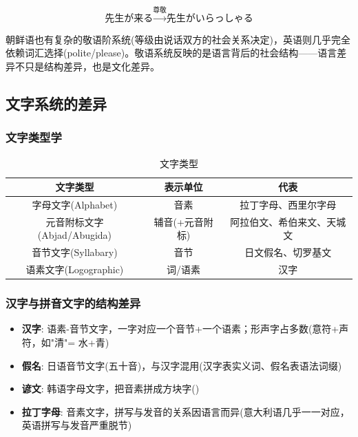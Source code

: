 \begin{equation}
    \text{先生が来る} \xrightarrow{\text{尊敬}} \text{先生がいらっしゃる}
\end{equation}

朝鲜语也有复杂的敬语阶系统(等级由说话双方的社会关系决定)，英语则几乎完全依赖词汇选择(polite/please)。敬语系统反映的是语言背后的社会结构——语言差异不只是结构差异，也是文化差异。

\subsection{文字系统的差异}

\subsubsection{文字类型学}

\begin{table}[H]
\centering
\caption{文字类型}
\begin{tabulary}{\textwidth}{@{}CCC@{}}
\toprule
\textbf{文字类型} & \textbf{表示单位} & \textbf{代表} \\
\midrule
字母文字(Alphabet) & 音素 & 拉丁字母、西里尔字母 \\
元音附标文字(Abjad/Abugida) & 辅音(+元音附标) & 阿拉伯文、希伯来文、天城文 \\
音节文字(Syllabary) & 音节 & 日文假名、切罗基文 \\
语素文字(Logographic) & 词/语素 & 汉字 \\
\bottomrule
\end{tabulary}
\end{table}

\subsubsection{汉字与拼音文字的结构差异}

\begin{itemize}
    \item \textbf{汉字}: 语素-音节文字，一字对应一个音节+一个语素；形声字占多数(意符+声符，如"清"= 水+青)
    \item \textbf{假名}: 日语音节文字(五十音)，与汉字混用(汉字表实义词、假名表语法词缀)
    \item \textbf{谚文}: 韩语字母文字，把音素拼成方块字()
    \item \textbf{拉丁字母}: 音素文字，拼写与发音的关系因语言而异(意大利语几乎一一对应，英语拼写与发音严重脱节)
\end{itemize}

